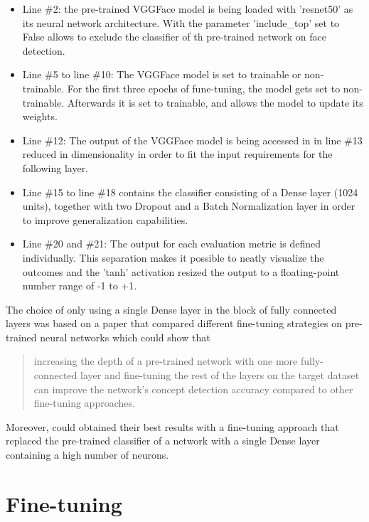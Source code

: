 \begin{itemize}
    \item Line \#2: the pre-trained VGGFace model is being loaded with 'resnet50' as its neural network architecture. With the parameter 'include\_top' set to False allows to exclude the classifier of th pre-trained network on face detection.
    \item Line \#5 to line \#10: The VGGFace model is set to trainable or non-trainable. For the first three epochs of fune-tuning, the model gets set to non-trainable. Afterwards it is set to trainable, and allows the model to update its weights.
    \item Line \#12: The output of the VGGFace model is being accessed in in line \#13 reduced in dimensionality in order to fit the input requirements for the following layer.
    \item Line \#15 to line \#18 contains the classifier consisting of a Dense layer (1024 units), together with two Dropout and a Batch Normalization layer in order to improve generalization capabilities.
    \item Line \#20 and \#21: The output for each evaluation metric is defined individually. This separation makes it possible to neatly visualize the outcomes and the 'tanh' activation resized the output to a floating-point number range of -1 to +1.
\end{itemize}

The choice of only using a single Dense layer in the block of fully connected layers was based on a paper \citep{Pittaras:2017:FineTuningStrategiesComparison} that compared different fine-tuning strategies on pre-trained neural networks which could show that
\begin{quote}
    increasing the depth of a pre-trained network with one more fully-connected layer and fine-tuning the rest of the layers on the target dataset can improve the network’s concept detection accuracy compared to other fine-tuning approaches. \citep[~p. 103]{Pittaras:2017:FineTuningStrategiesComparison}
\end{quote}

Moreover, \citet{Pittaras:2017:FineTuningStrategiesComparison} could obtained their best results with a fine-tuning approach that replaced the pre-trained classifier of a network with a single Dense layer containing a high number of neurons.



\section{Fine-tuning}
